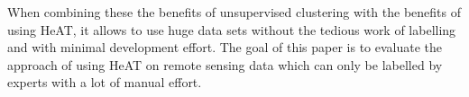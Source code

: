 When combining these the benefits of unsupervised clustering with the benefits of using \gls{HeAT}, it allows to use huge data sets without the tedious work of labelling and with minimal development effort.
The goal of this paper is to evaluate the approach of using \gls{HeAT} on remote sensing data which can only be labelled by experts with a lot of manual effort.
